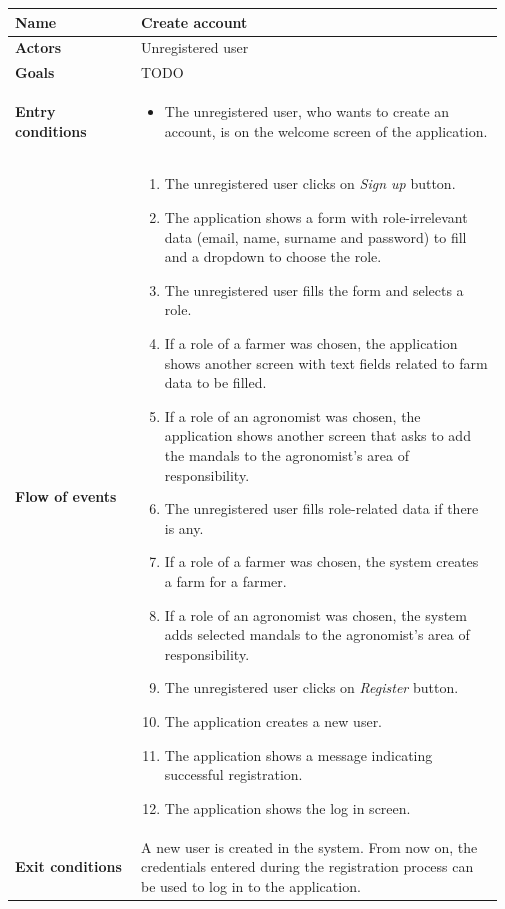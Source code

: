 \begin{table}[H]
    \centering
	\begin{tabular}{@{}p{0.25\linewidth} p{0.72\linewidth}@{}}
		\toprule
		\textbf{Name}               & Create account \\
		\midrule
		\textbf{Actors}             & Unregistered user \\
		\midrule
		\textbf{Goals}              & TODO \\
		\midrule
		
		\textbf{Entry conditions}   & \begin{itemize}[leftmargin=.4cm,noitemsep,topsep=0pt,before=\vspace{-3mm},after=\vspace{-4mm}]
		    \item The unregistered user, who wants to create an account, is  on the welcome screen of the application. \todo{check if it is consistent with UI mocks}
		\end{itemize}\\
		\midrule
		
		\textbf{Flow of events}     & \begin{enumerate}[leftmargin=.4cm,noitemsep,topsep=0pt,before=\vspace{-3mm},after=\vspace{-4mm}]
		    \item The unregistered user clicks on \textit{Sign up} button.
		    \item The application shows a form with role-irrelevant data (email, name, surname and password) to fill and a dropdown to choose the role.
		    \item The unregistered user fills the form and selects a role.
		    \item If a role of a farmer was chosen, the application shows another screen with text fields related to farm data to be filled.
		    \item If a role of an agronomist was chosen, the application shows another screen that asks to add the mandals to the agronomist's area of responsibility.
		    \item The unregistered user fills role-related data if there is any.
		    \item If a role of a farmer was chosen, the system creates a farm for a farmer.
		    \item If a role of an agronomist was chosen, the system adds selected mandals to the agronomist's area of responsibility.
		    \item The unregistered user clicks on \textit{Register} button.
		    \item The application creates a new user.
		    \item The application shows a message indicating successful registration.
		    \item The application shows the log in screen.
		\end{enumerate}\\
		\midrule
		\textbf{Exit conditions}    & A new user is created in the system. From now on, the credentials entered during the registration process can be used to log in to the application. \\
		\midrule
		

\end{tabular}
\end{table}
